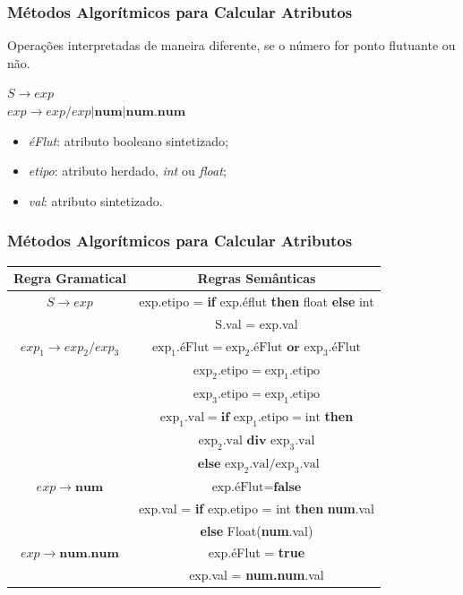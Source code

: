 \documentclass[table]{beamer}
\begin{document}
\begin{frame}
   \frametitle{Métodos Algorítmicos para Calcular Atributos}
   Operações interpretadas de maneira diferente, se o número for ponto flutuante ou não. \\
   \begin{center}
   $S\to exp$ \\
   $exp\to exp/exp|\textbf{num}|\textbf{num.num}$
   \end{center}
   \begin{itemize}
      \item \textit{éFlut}: atributo booleano sintetizado;
      \item \textit{etipo}: atributo herdado, \textit{int} ou \textit{float};
      \item \textit{val}: atributo sintetizado.
   \end{itemize}
\end{frame}

\begin{frame}
   \frametitle{Métodos Algorítmicos para Calcular Atributos}
   \begin{table}
      \begin{tabular}{cc}
      Regra Gramatical & Regras Semânticas \\
      \hline 
      $S\to exp$ & exp.etipo = \textbf{if} exp.éflut \textbf{then} float \textbf{else} int \\
                 & S.val = exp.val \\      
      \hline
      $exp_{1}\to exp_{2}/exp_{3}$ & $\text{exp}_{1}.\text{éFlut} = \text{exp}_{2}.\text{éFlut} \textbf{ or } \text{exp}_{3}.\text{éFlut}$ \\ 
      & $\text{exp}_{2}.\text{etipo} = \text{exp}_{1}.\text{etipo}$ \\
      & $\text{exp}_{3}.\text{etipo} = \text{exp}_{1}.\text{etipo}$ \\
      & $\text{exp}_{1}.\text{val} = \textbf{if } \text{exp}_{1}.\text{etipo} = \text{int}$ \textbf{ then } \\
      & $\text{exp}_{2}.\text{val} \textbf{ div } \text{exp}_{3}.\text{val} $ \\
      & $\textbf{ else } \text{exp}_{2}.\text{val} / \text{exp}_{3}.\text{val} $ \\ 
      \hline
      $exp\to \textbf{num}$ & $\text{exp.éFlut} = \textbf{false}$ \\
      & exp.val = \textbf{if} exp.etipo = int \textbf{then} \textbf{num}.val \\
      & \textbf{else} Float(\textbf{num}.val) \\
      \hline
      $exp \to \textbf{num.num}$ & exp.éFlut = \textbf{true} \\
      & exp.val = \textbf{num.num}.val \\
      \end{tabular}
   \end{table}
\end{frame}
\end{document}
